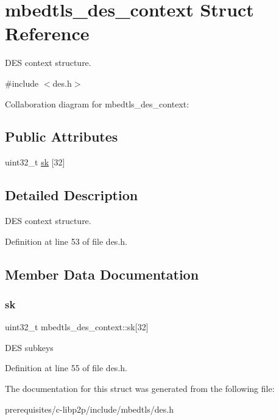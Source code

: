 \hypertarget{structmbedtls__des__context}{}\section{mbedtls\+\_\+des\+\_\+context Struct Reference}
\label{structmbedtls__des__context}


D\+ES context structure.  




{\ttfamily \#include $<$des.\+h$>$}



Collaboration diagram for mbedtls\+\_\+des\+\_\+context\+:
\subsection*{Public Attributes}
\begin{DoxyCompactItemize}
\item 
uint32\+\_\+t \mbox{\hyperlink{structmbedtls__des__context_a964fb6a2eb38c2bdcd9ff1ac42b9378c}{sk}} \mbox{[}32\mbox{]}
\end{DoxyCompactItemize}


\subsection{Detailed Description}
D\+ES context structure. 

Definition at line 53 of file des.\+h.



\subsection{Member Data Documentation}
\mbox{\label{structmbedtls__des__context_a964fb6a2eb38c2bdcd9ff1ac42b9378c}} 
\subsubsection{\texorpdfstring{sk}{sk}}
{\footnotesize\ttfamily uint32\+\_\+t mbedtls\+\_\+des\+\_\+context\+::sk\mbox{[}32\mbox{]}}

D\+ES subkeys 

Definition at line 55 of file des.\+h.



The documentation for this struct was generated from the following file\+:\begin{DoxyCompactItemize}
\item 
prerequisites/c-\/libp2p/include/mbedtls/des.\+h\end{DoxyCompactItemize}
